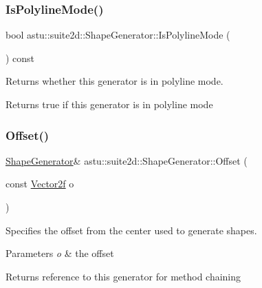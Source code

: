 \subsubsection{\texorpdfstring{Is\+Polyline\+Mode()}{IsPolylineMode()}}
{\footnotesize\ttfamily bool astu\+::suite2d\+::\+Shape\+Generator\+::\+Is\+Polyline\+Mode (\begin{DoxyParamCaption}{ }\end{DoxyParamCaption}) const\hspace{0.3cm}{\ttfamily [inline]}}

Returns whether this generator is in polyline mode.

\begin{DoxyReturn}{Returns}
{\ttfamily true} if this generator is in polyline mode 
\end{DoxyReturn}
\mbox{\label{classastu_1_1suite2d_1_1ShapeGenerator_aafbe132e9fa8b459377e34fc384db6ae}} 
\subsubsection{\texorpdfstring{Offset()}{Offset()}\hspace{0.1cm}{\footnotesize\ttfamily [1/2]}}
{\footnotesize\ttfamily \hyperlink{classastu_1_1suite2d_1_1ShapeGenerator}{Shape\+Generator}\& astu\+::suite2d\+::\+Shape\+Generator\+::\+Offset (\begin{DoxyParamCaption}\item[{const \hyperlink{classastu_1_1Vector2}{Vector2f}}]{o }\end{DoxyParamCaption})\hspace{0.3cm}{\ttfamily [inline]}}

Specifies the offset from the center used to generate shapes.


\begin{DoxyParams}{Parameters}
{\em o} & the offset \\
\hline
\end{DoxyParams}
\begin{DoxyReturn}{Returns}
reference to this generator for method chaining 
\end{DoxyReturn}
\mbox{\label{classastu_1_1suite2d_1_1ShapeGenerator_a9d9b5606c488f7179349ead083e79a7d}} 
